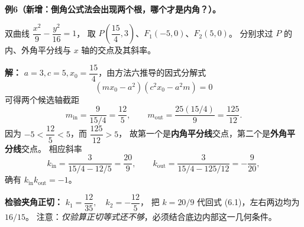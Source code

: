 \clearpage
\begin{examplebox}
\textbf{例6（新增：倒角公式法会出现两个根，哪个才是内角？）。}

双曲线 $\dfrac{x^2}{9}-\dfrac{y^2}{16}=1$，
取 $P\left(\dfrac{15}{4},3\right)$、$F_1(-5,0)$、$F_2(5,0)$。
分别求过 $P$ 的内、外角平分线与 $x$ 轴的交点及其斜率。

\textbf{解：} $a=3,c=5,x_0=\dfrac{15}{4}$，由方法六推导的因式分解式
\[
 (mx_0-a^2)(c^2x_0-a^2m)=0
\]
可得两个候选轴截距
\[
 m_\mathrm{in}=\frac{9}{15/4}=\boxed{\frac{12}{5}},\qquad
 m_\mathrm{out}=\frac{25(15/4)}{9}=\boxed{\frac{125}{12}}.
\]
因为 $-5<\dfrac{12}{5}<5$，而 $\dfrac{125}{12}>5$，
故第一个是\textbf{内角平分线}交点，第二个是\textbf{外角平分线}交点。
相应斜率
\[
 k_\mathrm{in}=\frac{3}{15/4-12/5}=\boxed{\frac{20}{9}},\qquad
 k_\mathrm{out}=\frac{3}{15/4-125/12}=\boxed{-\frac9{20}},
\]
确有 $k_\mathrm{in}k_\mathrm{out}=-1$。

\textbf{检验夹角正切：} $k_1=\dfrac{12}{35},\quad k_2=-\dfrac{12}{5}$，
把 $k=20/9$ 代回式 (6.1)，左右两边均为 $16/15$。
注意：\emph{仅验算正切等式还不够}，必须结合底边内部这一几何条件。
\end{examplebox}
